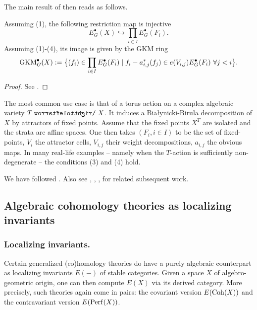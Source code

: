 The main result of \cite{HHH05} then reads as follows.
\begin{proposition}\label{proposition: GKM of HHH}
Assuming (1), the following restriction map is injective
\begin{equation*}
    E^{\bullet}_G(X) \hookrightarrow \prod_{i \in I} E^{\bullet}_G(F_i).
\end{equation*}
Assuming (1)-(4), its image is given by the GKM ring
\begin{equation*}
    \operatorname{GKM}^{\bullet}_G(X) := \big\{ (f_i) \in \prod_{i \in I} E^{\bullet}_G(F_i) \mid f_i - a^*_{i, j} (f_j) \in e(V_{i, j}) E^{\bullet}_G(F_i)  \ \forall j < i \big\}.
\end{equation*}   
\end{proposition}
\begin{proof}
   See \cite[Theorems 3.1 and 2.3]{HHH05}.
\end{proof}

\begin{remark}\label{remark: GKM in the BB case}
The most common use case is that of a torus action on a complex algebraic variety $T \acts X$. It induces a Białynicki-Birula decomposition of $X$ by attractors of fixed points. Assume that the fixed points $X^T$ are isolated and the strata are affine spaces. One then takes $(F_i, i\in I)$ to be the set of fixed-points, $V_{i}$ the attractor cells, $V_{i, j}$ their weight decompositions, $a_{i, j}$ the obvious maps. In many real-life examples -- namely when the $T$-action is sufficiently non-degenerate -- the conditions (3) and (4) hold.
\end{remark}

We have followed \cite{HHH05}. Also see \cite[Appendix A]{Ros03}, \cite{HHRW16}, \cite{Zho25}, \cite{KR21} for related subsequent work.









\subsection{Algebraic cohomology theories as localizing invariants}\label{section: algebraic cohomology theories as localizing invariants}


\subsubsection{Localizing invariants.}
Certain generalized (co)homology theories do have a purely algebraic counterpart as localizing invariants $E(-)$ of stable categories. Given a space $X$ of algebro-geometric origin, one can then compute $E(X)$ via its derived category. More precisely, such theories again come in pairs: the covariant version $E(\operatorname{Coh}(X))$ and the contravariant version $E(\operatorname{Perf}(X))$. 


